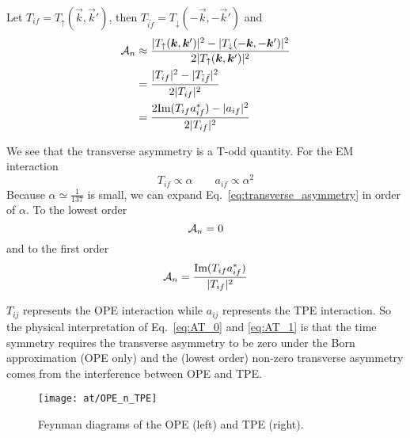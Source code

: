 Let $T_{if} = T_{\uparrow}(\vec{k}, \vec{k}')$, then $T_{\tilde{i}\tilde{f}} = T_\downarrow (-\vec{k}, -\vec{k}')$
and
\begin{equation}
    \begin{aligned}
	\mathcal{A}_n &\approx \frac{|T_{\uparrow}(\boldsymbol{k}, \boldsymbol{k}')|^2 - |T_{\downarrow}(-\boldsymbol{k}, -\boldsymbol{k}')|^2}{2|T_{\uparrow}(\boldsymbol{k}, \boldsymbol{k}')|^2} \\
	    &= \frac{|T_{if}|^2 - |T_{\tilde{i}\tilde{f}}|^2}{2|T_{if}|^2}  \\
	    &= \frac{2\text{Im}(T_{if}a^*_{if}) - |a_{if}|^2}{2|T_{if}|^2}
    \end{aligned}
    \label{eq:transverse_asymmetry}
\end{equation}

We see that the transverse asymmetry is a T-odd quantity. For the EM interaction
\begin{equation}
    T_{if} \propto \alpha \qquad a_{if} \propto \alpha^2
\end{equation}
Because $\alpha \simeq \frac{1}{137}$ is small, we can expand Eq.~\ref{eq:transverse_asymmetry} 
in order of $\alpha$. To the lowest order
\begin{equation}
    \mathcal{A}_n = 0
    \label{eq:AT_0}
\end{equation}
and to the first order 
\begin{equation}
    \mathcal{A}_n = \frac{\text{Im}(T_{if}a^*_{if})}{|T_{if}|^2}
    \label{eq:AT_1}
\end{equation}

$T_{ij}$ represents the OPE interaction while $a_{ij}$ represents
the TPE interaction. So the physical interpretation of
Eq.~\ref{eq:AT_0} and \ref{eq:AT_1} is that the time symmetry requires 
the transverse asymmetry to be zero under the Born approximation (OPE only)
and the (lowest order) non-zero transverse asymmetry comes from the interference 
between OPE and TPE.
\begin{figure}[!h]
    \centering
    \texttt{[image: at/OPE\_n\_TPE]}
    \caption{Feynman diagrams of the OPE (left) and TPE (right).}
\end{figure}

